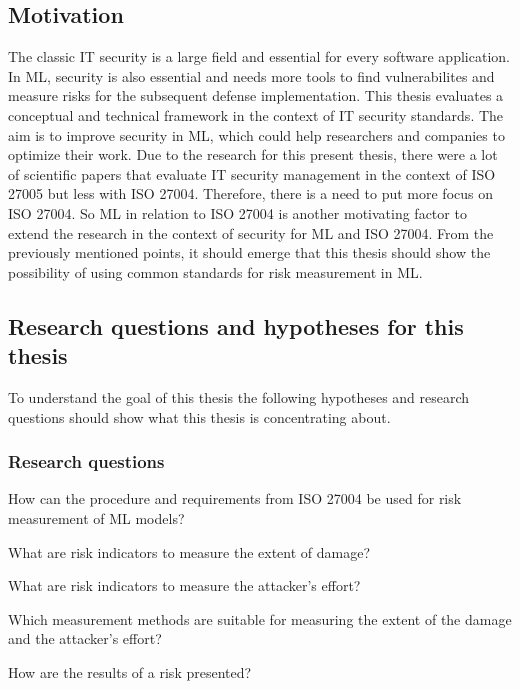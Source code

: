 \subsection{Motivation}

The classic IT security is a large field and essential for every software application. In ML, security is also essential and needs more tools to find vulnerabilites and measure risks for
the subsequent defense implementation. This thesis evaluates a conceptual and technical framework in the context of IT security standards. The aim is to improve security in ML, which could
help researchers and companies to optimize their work. Due to the research for this present thesis, there were a lot of scientific papers that evaluate IT security management in the
context of ISO 27005 but less with ISO 27004. Therefore, there is a need to put more focus on ISO 27004. So ML in relation to ISO 27004 is another motivating factor to extend the research
in the context of security for ML and ISO 27004. From the previously mentioned points, it should emerge that this thesis should show the possibility of using common standards for risk
measurement in ML.

\subsection{Research questions and hypotheses for this thesis}


To understand the goal of this thesis the following hypotheses and research questions should show what this thesis is concentrating about.

\subsubsection*{Research questions}

\begin{questions}
  \item How can the procedure and requirements from ISO 27004 be used for risk measurement of ML models? \label{itm:rq1}
  \item What are risk indicators to measure the extent of damage? \label{itm:rq2}
  \item What are risk indicators to measure the attacker's effort? \label{itm:rq3}
  \item Which measurement methods are suitable for measuring the extent of the damage and the attacker's effort? \label{itm:rq4}
  \item How are the results of a risk presented? \label{itm:rq5}
\end{questions}

